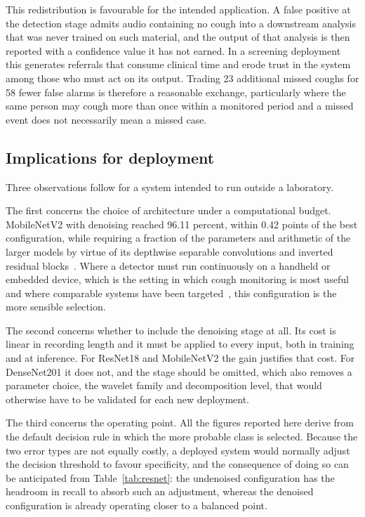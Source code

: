 \documentclass[pdflatex,sn-mathphys-num]{sn-jnl}
\begin{document}
This redistribution is favourable for the intended application. A false
positive at the detection stage admits audio containing no cough into a
downstream analysis that was never trained on such material, and the output of
that analysis is then reported with a confidence value it has not earned. In a
screening deployment this generates referrals that consume clinical time and
erode trust in the system among those who must act on its output. Trading 23
additional missed coughs for 58 fewer false alarms is therefore a reasonable
exchange, particularly where the same person may cough more than once within a
monitored period and a missed event does not necessarily mean a missed case.

\subsection{Implications for deployment}\label{sec:res-deploy}

Three observations follow for a system intended to run outside a laboratory.

The first concerns the choice of architecture under a computational budget.
MobileNetV2 with denoising reached 96.11 percent, within 0.42 points of the
best configuration, while requiring a fraction of the parameters and
arithmetic of the larger models by virtue of its depthwise separable
convolutions and inverted residual blocks~\cite{sandler2018}. Where a detector
must run continuously on a handheld or embedded device, which is the setting
in which cough monitoring is most useful and where comparable systems have
been targeted~\cite{hoyosbarcelo2018, karatas2021}, this configuration is the
more sensible selection.

The second concerns whether to include the denoising stage at all. Its cost is
linear in recording length and it must be applied to every input, both in
training and at inference. For ResNet18 and MobileNetV2 the gain justifies
that cost. For DenseNet201 it does not, and the stage should be omitted,
which also removes a parameter choice, the wavelet family and decomposition
level, that would otherwise have to be validated for each new deployment.

The third concerns the operating point. All the figures reported here derive
from the default decision rule in which the more probable class is selected.
Because the two error types are not equally costly, a deployed system would
normally adjust the decision threshold to favour specificity, and the
consequence of doing so can be anticipated from Table~\ref{tab:resnet}: the
undenoised configuration has the headroom in recall to absorb such an
adjustment, whereas the denoised configuration is already operating closer to
a balanced point.
\end{document}
